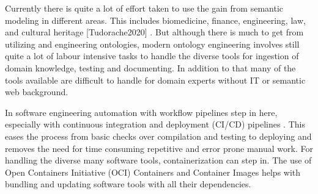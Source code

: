 \documentclass[sigconf]{acmart}
\begin{document}
Currently there is quite a lot of effort taken to use the gain from semantic modeling in different areas. This includes biomedicine, finance, engineering, law, and cultural heritage [Tudorache2020]  . But although there is much to get from utilizing and engineering ontologies, modern ontology engineering involves still quite a lot of labour intensive tasks to handle the diverse tools for ingestion of domain knowledge, testing and documenting. In addition to that many of the tools available are difficult to handle for domain experts without IT or semantic web background.

In software engineering automation with workflow pipelines step in here, especially with continuous integration and deployment (CI/CD) pipelines . This eases the process from basic checks over compilation and testing to deploying and removes the need for time consuming repetitive and error prone manual work. For handling the diverse many software tools, containerization can step in. The use of Open Containers Initiative (OCI) Containers and Container Images helps with bundling and updating software tools with all their dependencies.
\end{document}
